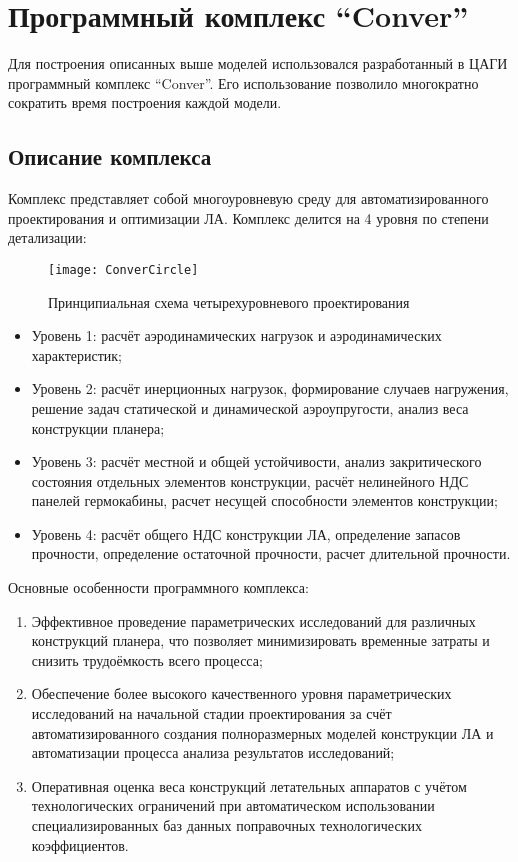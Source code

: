 \section{Программный комплекс ``Conver''}
\label{sec:Conver}

Для построения описанных выше моделей использовался разработанный в ЦАГИ программный комплекс ``Conver''. Его использование позволило многократно сократить время построения каждой модели. 

\subsection{Описание комплекса}
Комплекс представляет собой многоуровневую среду для автоматизированного проектирования и оптимизации ЛА. Комплекс делится на 4 уровня по степени детализации:



\begin{figure}[ht]
\centering
\texttt{[image: ConverCircle]} 
\caption{Принципиальная схема четырехуровневого проектирования}
\end{figure}



\begin{itemize}
\item Уровень 1: расчёт аэродинамических нагрузок и аэродинамических характеристик; 
\item Уровень 2: расчёт инерционных нагрузок, формирование случаев нагружения, решение задач статической и динамической аэроупругости, анализ веса конструкции планера;
\item Уровень 3: расчёт местной и общей устойчивости, анализ закритического состояния отдельных элементов конструкции, расчёт нелинейного НДС панелей гермокабины, расчет несущей способности элементов конструкции;
\item Уровень 4: расчёт общего НДС конструкции ЛА, определение запасов прочности, определение остаточной прочности, расчет длительной прочности.
\end{itemize}

Основные особенности программного комплекса:

\begin{enumerate}
\item Эффективное проведение параметрических исследований для различных конструкций планера, что позволяет минимизировать временные затраты и снизить трудоёмкость всего процесса;
\item Обеспечение более высокого качественного уровня параметрических исследований на начальной стадии проектирования за счёт автоматизированного создания полноразмерных моделей конструкции ЛА и автоматизации процесса анализа результатов исследований;
\item Оперативная оценка веса конструкций летательных аппаратов с учётом технологических ограничений при автоматическом использовании специализированных баз данных поправочных технологических коэффициентов.
\end{enumerate}


